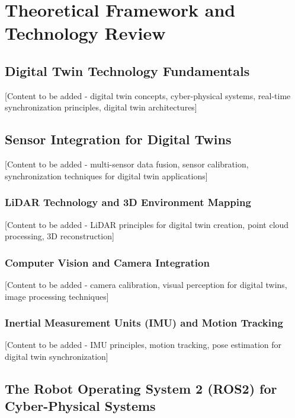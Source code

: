 \vspace{21.5pt}
\chapter{Theoretical Framework and Technology Review}

\section{Digital Twin Technology Fundamentals}

[Content to be added - digital twin concepts, cyber-physical systems, real-time synchronization principles, digital twin architectures]

\section{Sensor Integration for Digital Twins}

[Content to be added - multi-sensor data fusion, sensor calibration, synchronization techniques for digital twin applications]

\subsection{LiDAR Technology and 3D Environment Mapping}

[Content to be added - LiDAR principles for digital twin creation, point cloud processing, 3D reconstruction]

\subsection{Computer Vision and Camera Integration}

[Content to be added - camera calibration, visual perception for digital twins, image processing techniques]

\subsection{Inertial Measurement Units (IMU) and Motion Tracking}

[Content to be added - IMU principles, motion tracking, pose estimation for digital twin synchronization]

\section{The Robot Operating System 2 (ROS2) for Cyber-Physical Systems}

